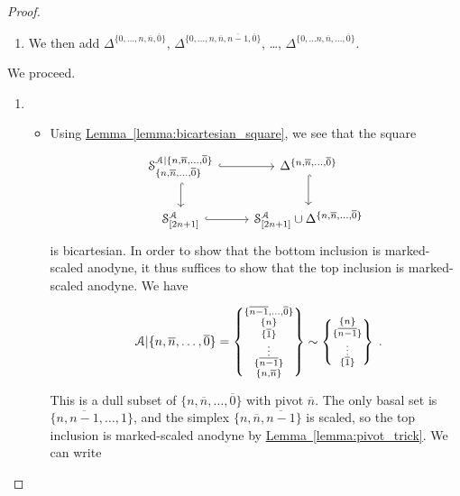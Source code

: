 \documentclass[main.tex]{subfiles}
\begin{document}
\begin{proof}
\begin{enumerate}
    \item We then add $\Delta^{\{0, \ldots, n, \overline{n}, \overline{0}\}}$, $\Delta^{\{0, \ldots, n, \overline{n}, \overline{n-1}, \overline{0}\}}$, \dots, $\Delta^{\{0, \ldots n, \overline{n}, \ldots, \overline{0}\}}$.
  \end{enumerate}
  We proceed.
  \begin{enumerate}
    \item 
      \begin{itemize}
        \item Using \hyperref[lemma:bicartesian_square]{Lemma~\ref*{lemma:bicartesian_square}}, we see that the square
          \begin{equation*}
            \begin{tikzcd}
              \S^{\mathcal{A}|\{n, \overline{n}, \ldots, \overline{0}\}}_{\{n, \overline{n}, \ldots, \overline{0}\}}
              \arrow[r, hook]
              \arrow[d, hook]
              & \Delta^{\{n, \overline{n}, \ldots, \overline{0}\}}
              \arrow[d, hook]
              \\
              \S^{\mathcal{A}}_{[2n+1]}
              \arrow[r, hook]
              & \S^{\mathcal{A}}_{[2n+1]} \cup \Delta^{\{n, \overline{n}, \ldots, \overline{0}\}}
            \end{tikzcd}
          \end{equation*}
          is bicartesian. In order to show that the bottom inclusion is marked-scaled anodyne, it thus suffices to show that the top inclusion is marked-scaled anodyne. We have
          \begin{equation*}
            \begin{tikzcd}
              \mathcal{A}|\{n, \overline{n}, \ldots, \overline{0}\} 
              = \left\{ \substack{ \{\overline{n-1}, \ldots, \overline{0}\} \\ \{n\} \\ \{\overline{1}\} \\ \vdots \\ \{\overline{n-1}\} \\ \{n, \overline{n}\} } \right\}
              \sim \left\{ \substack{ \{n\} \\ \{\overline{n-1}\} \\ \vdots \\ \{\overline{1}\} } \right\}
            \end{tikzcd}.
          \end{equation*}
          This is a dull subset of $\{n, \overline{n}, \ldots, \overline{0}\}$ with pivot $\overline{n}$. The only basal set is $\{n, \overline{n-1}, \ldots, 1\}$, and the simplex $\{n, \overline{n}, \overline{n-1}\}$ is scaled, so the top inclusion is marked-scaled anodyne by \hyperref[lemma:pivot_trick]{Lemma~\ref*{lemma:pivot_trick}}. We can write

\end{itemize}
\end{enumerate}
\end{proof}
\end{document}
